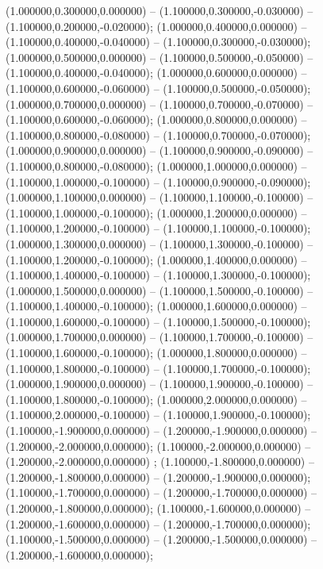  (1.000000,0.300000,0.000000) -- (1.100000,0.300000,-0.030000) -- (1.100000,0.200000,-0.020000);
 (1.000000,0.400000,0.000000) -- (1.100000,0.400000,-0.040000) -- (1.100000,0.300000,-0.030000);
 (1.000000,0.500000,0.000000) -- (1.100000,0.500000,-0.050000) -- (1.100000,0.400000,-0.040000);
 (1.000000,0.600000,0.000000) -- (1.100000,0.600000,-0.060000) -- (1.100000,0.500000,-0.050000);
 (1.000000,0.700000,0.000000) -- (1.100000,0.700000,-0.070000) -- (1.100000,0.600000,-0.060000);
 (1.000000,0.800000,0.000000) -- (1.100000,0.800000,-0.080000) -- (1.100000,0.700000,-0.070000);
 (1.000000,0.900000,0.000000) -- (1.100000,0.900000,-0.090000) -- (1.100000,0.800000,-0.080000);
 (1.000000,1.000000,0.000000) -- (1.100000,1.000000,-0.100000) -- (1.100000,0.900000,-0.090000);
 (1.000000,1.100000,0.000000) -- (1.100000,1.100000,-0.100000) -- (1.100000,1.000000,-0.100000);
 (1.000000,1.200000,0.000000) -- (1.100000,1.200000,-0.100000) -- (1.100000,1.100000,-0.100000);
 (1.000000,1.300000,0.000000) -- (1.100000,1.300000,-0.100000) -- (1.100000,1.200000,-0.100000);
 (1.000000,1.400000,0.000000) -- (1.100000,1.400000,-0.100000) -- (1.100000,1.300000,-0.100000);
 (1.000000,1.500000,0.000000) -- (1.100000,1.500000,-0.100000) -- (1.100000,1.400000,-0.100000);
 (1.000000,1.600000,0.000000) -- (1.100000,1.600000,-0.100000) -- (1.100000,1.500000,-0.100000);
 (1.000000,1.700000,0.000000) -- (1.100000,1.700000,-0.100000) -- (1.100000,1.600000,-0.100000);
 (1.000000,1.800000,0.000000) -- (1.100000,1.800000,-0.100000) -- (1.100000,1.700000,-0.100000);
 (1.000000,1.900000,0.000000) -- (1.100000,1.900000,-0.100000) -- (1.100000,1.800000,-0.100000);
 (1.000000,2.000000,0.000000) -- (1.100000,2.000000,-0.100000) -- (1.100000,1.900000,-0.100000);
 (1.100000,-1.900000,0.000000) -- (1.200000,-1.900000,0.000000) -- (1.200000,-2.000000,0.000000);
 (1.100000,-2.000000,0.000000) -- (1.200000,-2.000000,0.000000) ;
 (1.100000,-1.800000,0.000000) -- (1.200000,-1.800000,0.000000) -- (1.200000,-1.900000,0.000000);
 (1.100000,-1.700000,0.000000) -- (1.200000,-1.700000,0.000000) -- (1.200000,-1.800000,0.000000);
 (1.100000,-1.600000,0.000000) -- (1.200000,-1.600000,0.000000) -- (1.200000,-1.700000,0.000000);
 (1.100000,-1.500000,0.000000) -- (1.200000,-1.500000,0.000000) -- (1.200000,-1.600000,0.000000);
